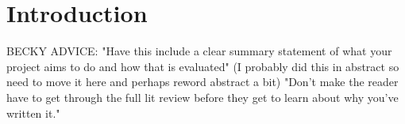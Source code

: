\chapter{Introduction}

BECKY ADVICE: "Have this include a clear summary statement of what your project aims to do and how that is evaluated" (I probably did this in abstract so need to move it here and perhaps reword abstract a bit) "Don't make the reader have to get through the full lit review before they get to learn about why you've written it." 